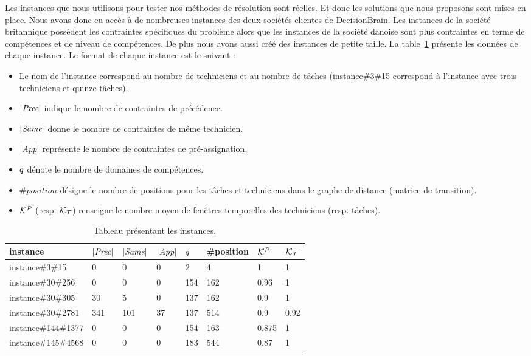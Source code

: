 Les instances que nous utilisons pour tester nos méthodes de résolution sont réelles. Et donc les solutions que nous proposons sont mises en place. 
Nous avons donc eu accès à de nombreuses instances des deux sociétés clientes de DecisionBrain.
Les instances de la société britannique possèdent les contraintes spécifiques du problème alors que les instances de la société danoise sont plus contraintes en terme de compétences et de niveau de compétences.
De plus nous avons aussi créé des instances de petite taille.
La table~\ref{table:instances} présente les données de chaque instance.
Le format de chaque instance est le suivant : 
\begin{itemize}
\item Le nom de l'instance correspond au nombre de techniciens et au nombre de tâches (instance\#3\#15 correspond à l'instance avec trois techniciens et quinze tâches).
\item $|\textit{Prec}|$ indique le nombre de contraintes de précédence.
\item $|\textit{Same}|$ donne le nombre de contraintes de même technicien.
\item $|\textit{App}|$ représente le nombre de contraintes de pré-assignation.
\item $q$ dénote le nombre de domaines de compétences.
\item $\#position$ désigne le nombre de positions pour les tâches et techniciens dans le graphe de distance (matrice de transition).
\item $\mathcal{K}^{\mathcal{P}}$ (resp. $\mathcal{K}_{\mathcal{T}}$) renseigne le nombre moyen de fenêtres temporelles des techniciens (resp. tâches).

\end{itemize}


\begin{table}
[H]
\centering
\begin{tabular}
{|l|l|l|l|l|l|l|l|}
\hline
instance & $|\textit{Prec}|$ & $ |\textit{Same}|$ & $|\textit{App}|$ & $q$ & \#position & $\mathcal{K}^{\mathcal{P}}$ & $\mathcal{K}_{\mathcal{T}}$\\
\hline
instance\#3\#15 & 0 & 0 & 0 & 2 & 4 & 1 & 1 \\
instance\#30\#256 & 0 & 0 & 0 & 154 & 162 & 0.96 & 1 \\
instance\#30\#305 & 30 & 5 & 0 & 137 & 162 & 0.9 & 1 \\
instance\#30\#2781 & 341 & 101 & 37 & 137 & 514 & 0.9 & 0.92 \\
instance\#144\#1377 & 0 & 0 & 0 & 154 & 163 & 0.875 & 1 \\
instance\#145\#4568 & 0 & 0 & 0 & 183 & 544 & 0.87 & 1 \\
\hline
\end{tabular}
\caption{Tableau présentant les instances.\label{table:instances}}

\end{table}


